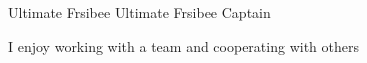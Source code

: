 \begin{cventries}
  \cventry
    {Ultimate Frsibee}
    {Ultimate Frsibee Captain}
    {}
    {}
    {
      \begin{cvitems}
        \item {I enjoy working with a team and cooperating with others}
      \end{cvitems}
    }


\end{cventries}
